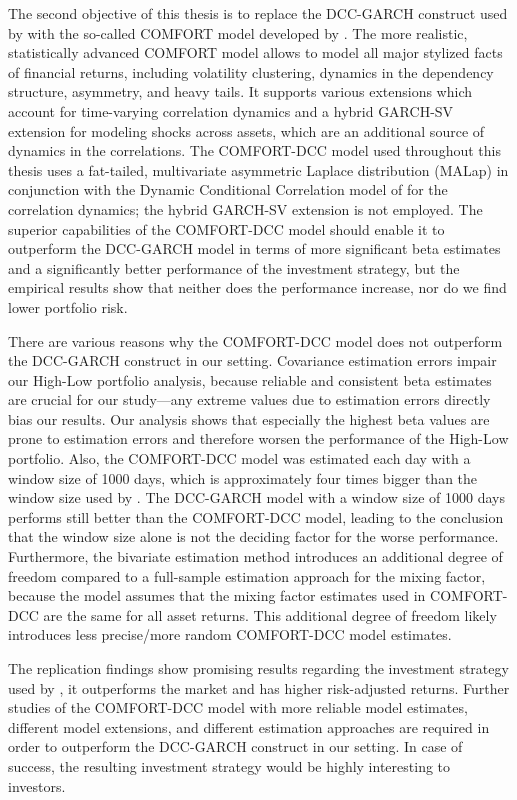 \begin{doublespacing}
The second objective of this thesis is to replace the DCC-GARCH construct used by  with the so-called COMFORT model developed by . The more realistic, statistically advanced COMFORT model allows to model all major stylized facts of financial returns, including volatility clustering, dynamics in the dependency structure, asymmetry, and heavy tails. It supports various extensions which account for time-varying correlation dynamics and a hybrid GARCH-SV extension for modeling shocks across assets, which are an additional source of dynamics in the correlations. The COMFORT-DCC model used throughout this thesis uses a fat-tailed, multivariate asymmetric Laplace distribution (MALap) in conjunction with the Dynamic Conditional Correlation model of  for the correlation dynamics; the hybrid GARCH-SV extension is not employed. The superior capabilities of the COMFORT-DCC model should enable it to outperform the DCC-GARCH model in terms of more significant beta estimates and a significantly better performance of the investment strategy, but the empirical results show that neither does the performance increase, nor do we find lower portfolio risk.

There are various reasons why the COMFORT-DCC model does not outperform the DCC-GARCH construct in our setting. Covariance estimation errors impair our High-Low portfolio analysis, because reliable and consistent beta estimates are crucial for our study---any extreme values due to estimation errors directly bias our results. Our analysis shows that especially the highest beta values are prone to estimation errors and therefore worsen the performance of the High-Low portfolio. Also, the COMFORT-DCC model was estimated each day with a window size of 1000 days, which is approximately four times bigger than the window size used by . The DCC-GARCH model with a window size of 1000 days performs still better than the COMFORT-DCC model, leading to the conclusion that the window size alone is not the deciding factor for the worse performance. Furthermore, the bivariate estimation method introduces an additional degree of freedom compared to a full-sample estimation approach for the mixing factor, because the model assumes that the mixing factor estimates used in COMFORT-DCC are the same for all asset returns. This additional degree of freedom likely introduces less precise/more random COMFORT-DCC model estimates.

The replication findings show promising results regarding the investment strategy used by , it outperforms the market and has higher risk-adjusted returns. Further studies of the COMFORT-DCC model with more reliable model estimates, different model extensions, and different estimation approaches are required in order to outperform the DCC-GARCH construct in our setting. In case of success, the resulting investment strategy would be highly interesting to investors.
 

\end{doublespacing}

